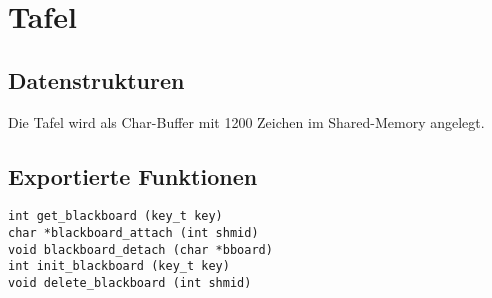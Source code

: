 \section{Tafel}

\subsection{Datenstrukturen}
Die Tafel wird als Char-Buffer mit 1200 Zeichen im Shared-Memory angelegt.

\subsection{Exportierte Funktionen}
\begin{lstlisting}
int get_blackboard (key_t key)
char *blackboard_attach (int shmid)
void blackboard_detach (char *bboard)
int init_blackboard (key_t key)
void delete_blackboard (int shmid)
\end{lstlisting}